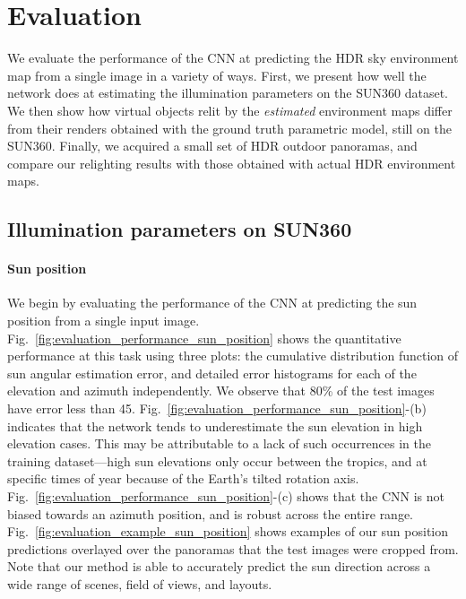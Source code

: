 \section{Evaluation}
\label{sec:evaluation}

We evaluate the performance of the CNN at predicting the HDR sky environment map from a single image in a variety of ways. First, we present how well the network does at estimating the illumination parameters on the SUN360 dataset. We then show how virtual objects relit by the \emph{estimated} environment maps differ from their renders obtained with the ground truth parametric model, still on the SUN360. Finally, we acquired a small set of HDR outdoor panoramas, and compare our relighting results with those obtained with actual HDR environment maps. 

\subsection{Illumination parameters on SUN360}

\paragraph{Sun position}

We begin by evaluating the performance of the CNN at predicting the sun position from a single input image. Fig.~\ref{fig:evaluation_performance_sun_position} shows the quantitative performance at this task using three plots: the cumulative distribution function of sun angular estimation error, and detailed error histograms for each of the elevation and azimuth independently. We observe that 80\% of the test images have error less than 45\degree. Fig.~\ref{fig:evaluation_performance_sun_position}-(b) indicates that the network tends to underestimate the sun elevation in high elevation cases. This may be attributable to a lack of such occurrences in the training dataset---high sun elevations only occur between the tropics, and at specific times of year because of the Earth's tilted rotation axis. Fig.~\ref{fig:evaluation_performance_sun_position}-(c) shows that the CNN is not biased towards an azimuth position, and is robust across the entire range. Fig.~\ref{fig:evaluation_example_sun_position} shows examples of our sun position predictions overlayed over the panoramas that the test images were cropped from. Note that our method is able to accurately predict the sun direction across a wide range of scenes, field of views, and layouts.

